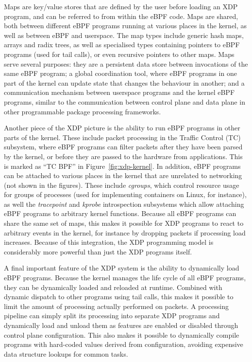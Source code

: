 \documentclass[10pt,sigconf]{acmart}
\begin{document}
%

Maps are key/value stores that are defined by the user before loading an XDP
program, and can be referred to from within the eBPF code. Maps are shared, both
between different eBPF programs running at various places in the kernel, as well
as between eBPF and userspace. The map types include generic hash maps, arrays
and radix trees, as well as specialised types containing pointers to eBPF
programs (used for tail calls), or even recursive pointers to other maps. Maps
serve several purposes: they are a persistent data store between invocations of
the same eBPF program; a global coordination tool, where eBPF programs in one
part of the kernel can update state that changes the behaviour in another; and a
communication mechanism between userspace programs and the kernel eBPF programs,
similar to the communication between control plane and data plane in other
programmable package processing frameworks.

Another piece of the XDP picture is the ability to run eBPF programs in other
parts of the kernel. These include packet processing in the Traffic Control (TC)
subsystem, where eBPF programs can filter packets after they have been parsed by
the kernel, or before they are passed to the hardware from applications. This is
marked as ``TC BPF'' in Figure~\ref{fig:xdp-kernel}. In addition, eBPF programs
can be attached to various places in the kernel that are unrelated to networking
(not shown in the figures). These include \emph{cgroups}, which control resource
usage for groups of processes (used for implementing containers on Linux, for
instance), as well the \emph{tracepoint} and \emph{kprobe} introspection
subsystems which allow attaching eBPF programs to arbitrary kernel functions.
Because all eBPF programs can share the same set of maps, this makes it possible
for XDP programs to react to arbitrary events in the kernel, for instance by
dropping packets if processing load increases. Because of this integration, the
XDP programming model is considerably more powerful than just the XDP programs
itself.

A final important feature of the XDP system is the ability to dynamically load
eBPF programs. Because the kernel manages the life cycle of all eBPF programs,
they can be dynamically loaded and reloaded at runtime. Combined with dynamic
dispatch to other programs using tail calls, this makes it possible to limit the
amount of processing actually performed on packets. A processing pipeline can
simply split its processing into separate XDP programs and dynamically load and
unload them as features are enabled or disabled through control plane
configuration. This also makes it possible to dynamically compile programs with
hard-coded values derived from configuration, avoiding expensive data structure
lookups for common tasks.
\end{document}
